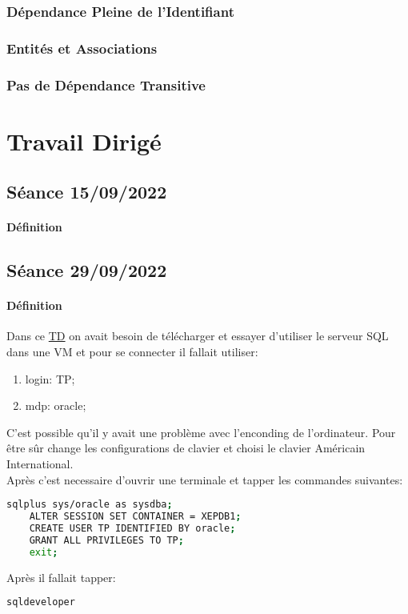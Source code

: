 \documentclass{article}
\begin{document}
\subsubsection{Dépendance Pleine de l'Identifiant}
\subsubsection{Entités et Associations}
\subsubsection{Pas de Dépendance Transitive}

\section{Travail Dirigé}
\subsection{Séance 15/09/2022}
\paragraph{Définition}

\subsection{Séance 29/09/2022}
\paragraph{Définition}Dans ce \href{http://www-smis.inria.fr/~anciaux/ENSTA/IN206/6-VM/}{TD} on avait besoin de télécharger et essayer d'utiliser le serveur SQL dans une VM et pour se connecter il fallait utiliser:
\begin{enumerate}[noitemsep]
    \item login: TP;
    \item mdp: oracle;
\end{enumerate}
C'est possible qu'il y avait une problème avec l'enconding de l'ordinateur. Pour être sûr change les configurations de clavier et choisi le clavier Américain International.\\

\noindent Après c'est necessaire d'ouvrir une terminale et tapper les commandes suivantes:
\begin{scriptsize}\mycode
    \begin{lstlisting}[language=Bash]
    sqlplus sys/oracle as sysdba;
    ALTER SESSION SET CONTAINER = XEPDB1;
    CREATE USER TP IDENTIFIED BY oracle;
    GRANT ALL PRIVILEGES TO TP;
    exit;
    \end{lstlisting}
\end{scriptsize}
\noindent Après il fallait tapper:
\begin{scriptsize}\mycode
    \begin{lstlisting}[language=Bash]
    sqldeveloper
    \end{lstlisting}
\end{scriptsize}
\end{document}
